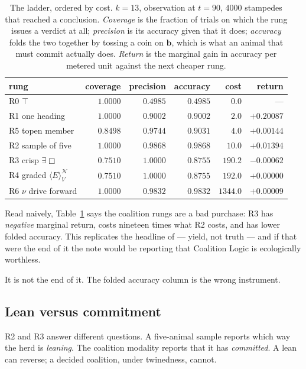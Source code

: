 \documentclass[11pt,a4paper]{article}
\theoremstyle{plain}
\theoremstyle{definition}
\theoremstyle{remark}
\newcommand{\Ebox}{\exists\Box}
\newcommand{\gE}[2]{\langle E\rangle^{#1}_{#2}}
\newcommand{\Nsp}{\mathcal{N}}
\newcommand{\Val}{V}
\newcommand{\bv}{\mathbf{b}}
\begin{document}
\begin{table}[t]
\centering
\begin{tabular}{@{}lrrrrr@{}}
\toprule
rung & coverage & precision & accuracy & cost & return\\
\midrule
R0 $\top$                  & $1.0000$ & $0.4985$ & $0.4985$ & $0.0$    & ---\\
R1 one heading             & $1.0000$ & $0.9002$ & $0.9002$ & $2.0$    & $+0.20087$\\
R5 topen member            & $0.8498$ & $0.9744$ & $0.9031$ & $4.0$    & $+0.00144$\\
R2 sample of five          & $1.0000$ & $0.9868$ & $0.9868$ & $10.0$   & $+0.01394$\\
R3 crisp $\Ebox$           & $0.7510$ & $1.0000$ & $0.8755$ & $190.2$  & $-0.00062$\\
R4 graded $\gE{\Nsp}{\Val}$& $0.7510$ & $1.0000$ & $0.8755$ & $192.0$  & $+0.00000$\\
R6 $\nu$ drive forward     & $1.0000$ & $0.9832$ & $0.9832$ & $1344.0$ & $+0.00009$\\
\bottomrule
\end{tabular}
\caption{The ladder, ordered by cost. $k = 13$, observation at $t = 90$, $4000$
stampedes that reached a conclusion. \emph{Coverage} is the fraction of trials
on which the rung issues a verdict at all; \emph{precision} is its accuracy
given that it does; \emph{accuracy} folds the two together by tossing a coin on
$\bv$, which is what an animal that must commit actually does. \emph{Return} is
the marginal gain in accuracy per metered unit against the next cheaper rung.}
\label{tab:ladder}
\end{table}

Read naively, Table~\ref{tab:ladder} says the coalition rungs are a bad
purchase: R3 has \emph{negative} marginal return, costs nineteen times what R2
costs, and has lower folded accuracy. This replicates the headline of
\cite{game} --- yield, not truth --- and if that were the end of it the note
would be reporting that Coalition Logic is ecologically worthless.

It is not the end of it. The folded accuracy column is the wrong instrument.

\subsection{Lean versus commitment}\label{sec:leanvscommit}

R2 and R3 answer different questions. A five-animal sample reports which way the
herd is \emph{leaning}. The coalition modality reports that it has
\emph{committed}. A lean can reverse; a decided coalition, under twinedness,
cannot.
\end{document}
